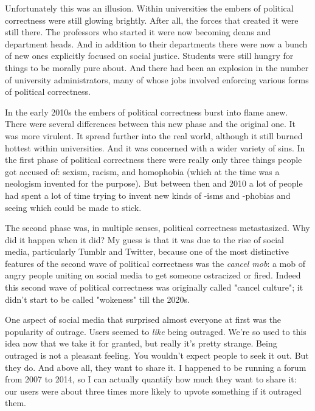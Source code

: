 Unfortunately this was an
                  illusion. Within universities the embers of political
                  correctness were still glowing brightly. After all, the forces
                  that created it were still there. The professors who started
                  it were now becoming deans and department heads. And in
                  addition to their departments there were now a bunch of new
                  ones explicitly focused on social justice. Students were still
                  hungry for things to be morally pure about. And there had been
                  an explosion in the number of university administrators, many
                  of whose jobs involved enforcing various forms of political
                  correctness.

In the early 2010s the embers of
                  political correctness burst into flame anew. There were
                  several differences between this new phase and the original
                  one. It was more virulent. It spread further into the real
                  world, although it still burned hottest within universities.
                  And it was concerned with a wider variety of sins. In the
                  first phase of political correctness there were really only
                  three things people got accused of: sexism, racism, and
                  homophobia (which at the time was a neologism invented for the
                  purpose). But between then and 2010 a lot of people had spent
                  a lot of time trying to invent new kinds of -isms and -phobias
                  and seeing which could be made to stick.

The second
                  phase was, in multiple senses, political correctness
                  metastasized. Why did it happen when it did? My guess is that
                  it was due to the rise of social media, particularly Tumblr
                  and Twitter, because one of the most distinctive features of
                  the second wave of political correctness was the
                  \emph{cancel mob}: a mob of angry people uniting on social
                  media to get someone ostracized or fired. Indeed this second
                  wave of political correctness was originally called "cancel
                  culture"; it didn't start to be called "wokeness" till the
                  2020s.

One aspect of social media that surprised
                  almost everyone at first was the popularity of outrage. Users
                  seemed to \emph{like} being outraged. We're so used to this
                  idea now that we take it for granted, but really it's pretty
                  strange. Being outraged is not a pleasant feeling. You
                  wouldn't expect people to seek it out. But they do. And above
                  all, they want to share it. I happened to be running a forum
                  from 2007 to 2014, so I can actually quantify how much they
                  want to share it: our users were about three times more likely
                  to upvote something if it outraged them.

